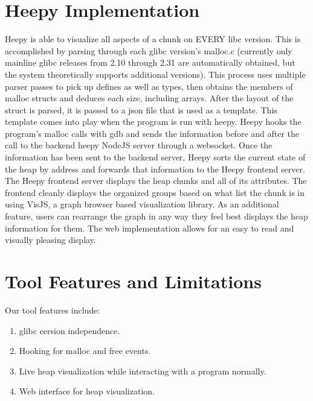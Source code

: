\documentclass[12pt]{article}
\begin{document}
\section{Heepy Implementation}

Heepy is able to visualize all aspects of a chunk on EVERY libc version. This is accomplished by parsing through each glibc version’s malloc.c (currently only mainline glibc releases from 2.10 through 2.31 are automatically obtained, but the system theoretically supports additional versions). This process uses multiple parser passes to pick up defines as well as types, then obtains the members of malloc structs and deduces each size, including arrays. After the layout of the struct is parsed, it is passed to a json file that is used as a template. This template comes into play when the program is run with heepy. Heepy hooks the program’s malloc calls with gdb and sends the information before and after the call to the backend heepy NodeJS server through a websocket. Once the information has been sent to the backend server, Heepy sorts the current state of the heap by address and forwards that information to the Heepy frontend server. The Heepy frontend server displays the heap chunks and all of its attributes. The frontend cleanly displays the organized groups based on what list the chunk is in using VisJS, a graph browser based visualization library. As an additional feature, users can rearrange the graph in any way they feel best displays the heap information for them. The web implementation allows for an easy to read and visually pleasing display. \\

\section{Tool Features and Limitations}

Our tool features include: \\

\begin{enumerate}
    \item glibc cersion independence. \\
    \item Hooking for malloc and free events. \\
    \item Live heap visualization while interacting with a program normally. \\
    \item Web interface for heap visualization. \\
\end{enumerate}
\end{document}

